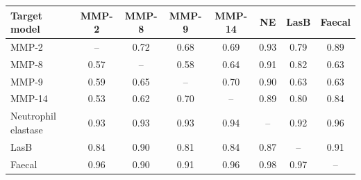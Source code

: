 \begin{tabular}{@{}lccccccc@{}}\toprule
Target model & MMP-2 & MMP-8 & MMP-9 & MMP-14 & NE & LasB & Faecal \\\midrule
MMP-2 & -- & 0.72 & 0.68 & 0.69 & 0.93 & 0.79 & 0.89 \\
MMP-8 & 0.57 & -- & 0.58 & 0.64 & 0.91 & 0.82 & 0.63 \\
MMP-9 & 0.59 & 0.65 & -- & 0.70 & 0.90 & 0.63 & 0.63 \\
MMP-14 & 0.53 & 0.62 & 0.70 & -- & 0.89 & 0.80 & 0.84 \\
Neutrophil elastase & 0.93 & 0.93 & 0.93 & 0.94 & -- & 0.92 & 0.96 \\
LasB & 0.84 & 0.90 & 0.81 & 0.84 & 0.87 & -- & 0.91 \\
Faecal & 0.96 & 0.90 & 0.91 & 0.96 & 0.98 & 0.97 & -- \\
\bottomrule\end{tabular}
